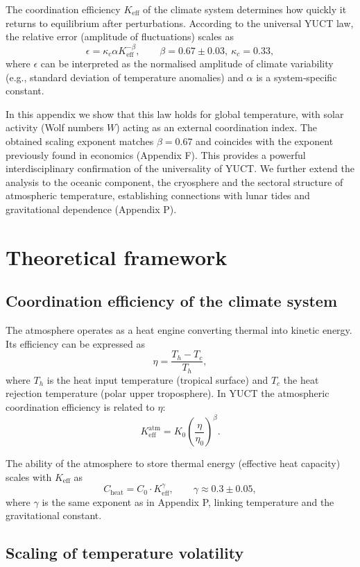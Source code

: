 \documentclass[12pt,a4paper]{article}
\newcommand{\Keff}{K_{\mathrm{eff}}}
\newcommand{\kappac}{\kappa_c}
\newcommand{\be}{\beta}
\newcommand{\ga}{\gamma}
\begin{document}
	The coordination efficiency \(\Keff\) of the climate system determines how quickly it returns to equilibrium after perturbations. According to the universal YUCT law, the relative error (amplitude of fluctuations) scales as
	\[
	\epsilon = \kappac \alpha \Keff^{-\be}, \qquad \be = 0.67 \pm 0.03,\ \kappac = 0.33,
	\]
	where \(\epsilon\) can be interpreted as the normalised amplitude of climate variability (e.g., standard deviation of temperature anomalies) and \(\alpha\) is a system‑specific constant.
	
	In this appendix we show that this law holds for global temperature, with solar activity (Wolf numbers \(W\)) acting as an external coordination index. The obtained scaling exponent matches \(\be = 0.67\) and coincides with the exponent previously found in economics (Appendix F). This provides a powerful interdisciplinary confirmation of the universality of YUCT. We further extend the analysis to the oceanic component, the cryosphere and the sectoral structure of atmospheric temperature, establishing connections with lunar tides and gravitational dependence (Appendix P).
	
	\section{Theoretical framework}
	
	\subsection{Coordination efficiency of the climate system}
	
	The atmosphere operates as a heat engine converting thermal into kinetic energy. Its efficiency can be expressed as
	\[
	\eta = \frac{T_h - T_c}{T_h},
	\]
	where \(T_h\) is the heat input temperature (tropical surface) and \(T_c\) the heat rejection temperature (polar upper troposphere). In YUCT the atmospheric coordination efficiency is related to \(\eta\):
	\[
	\Keff^{\text{atm}} = K_0 \left( \frac{\eta}{\eta_0} \right)^{\be}.
	\]
	
	The ability of the atmosphere to store thermal energy (effective heat capacity) scales with \(\Keff\) as
	\[
	C_{\text{heat}} = C_0 \cdot \Keff^{\ga}, \qquad \ga \approx 0.3 \pm 0.05,
	\]
	where \(\ga\) is the same exponent as in Appendix P, linking temperature and the gravitational constant.
	
	\subsection{Scaling of temperature volatility}
	
\end{document}
